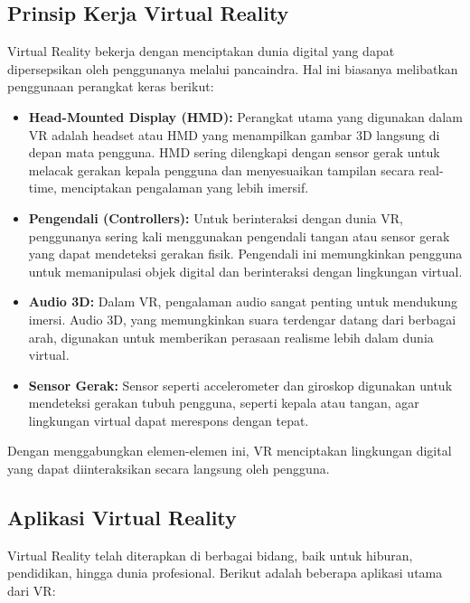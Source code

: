 \subsection{Prinsip Kerja Virtual Reality}
\label{subsec:prinsipkerja_vr}

Virtual Reality bekerja dengan menciptakan dunia digital yang dapat dipersepsikan oleh penggunanya melalui pancaindra. Hal ini biasanya melibatkan penggunaan perangkat keras berikut:

\begin{itemize}
    \item \textbf{Head-Mounted Display (HMD):} Perangkat utama yang digunakan dalam VR adalah headset atau HMD yang menampilkan gambar 3D langsung di depan mata pengguna. HMD sering dilengkapi dengan sensor gerak untuk melacak gerakan kepala pengguna dan menyesuaikan tampilan secara real-time, menciptakan pengalaman yang lebih imersif.
    \item \textbf{Pengendali (Controllers):} Untuk berinteraksi dengan dunia VR, penggunanya sering kali menggunakan pengendali tangan atau sensor gerak yang dapat mendeteksi gerakan fisik. Pengendali ini memungkinkan pengguna untuk memanipulasi objek digital dan berinteraksi dengan lingkungan virtual.
    \item \textbf{Audio 3D:} Dalam VR, pengalaman audio sangat penting untuk mendukung imersi. Audio 3D, yang memungkinkan suara terdengar datang dari berbagai arah, digunakan untuk memberikan perasaan realisme lebih dalam dunia virtual.
    \item \textbf{Sensor Gerak:} Sensor seperti accelerometer dan giroskop digunakan untuk mendeteksi gerakan tubuh pengguna, seperti kepala atau tangan, agar lingkungan virtual dapat merespons dengan tepat.
\end{itemize}

Dengan menggabungkan elemen-elemen ini, VR menciptakan lingkungan digital yang dapat diinteraksikan secara langsung oleh pengguna.

\subsection{Aplikasi Virtual Reality}
\label{subsec:aplikasivr}

Virtual Reality telah diterapkan di berbagai bidang, baik untuk hiburan, pendidikan, hingga dunia profesional. Berikut adalah beberapa aplikasi utama dari VR:

